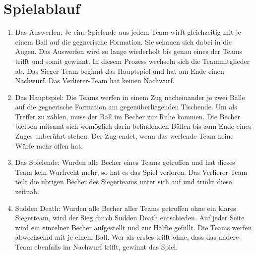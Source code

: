 \section{Spielablauf}\label{Bier-Pong:Spielablauf}
\begin{enumerate}[label={(\arabic*)}]
    \item
    Das Auswerfen: Je eine Spielende aus jedem Team wirft gleichzeitig mit je einem Ball auf die gegnerische Formation.
    Sie schauen sich dabei in die Augen. Das Auswerfen wird so lange wiederholt bis genau eines der Teams trifft und somit gewinnt.
    In diesem Prozess wechseln sich die Teammitglieder ab.
    Das Sieger-Team beginnt das Hauptspiel und hat am Ende einen Nachwurf.
    Das Verlierer-Team hat keinen Nachwurf.

    \item
    Das Hauptspiel: Die Teams werfen in einem Zug nacheinander je zwei Bälle auf die gegnerische Formation am gegenüberliegenden Tischende.
    Um als Treffer zu zählen, muss der Ball im Becher zur Ruhe kommen.
    Die Becher bleiben mitsamt sich womöglich darin befindenden Bällen bis zum Ende eines Zuges unberührt stehen.
    Der Zug endet, wenn das werfende Team keine Würfe mehr offen hat.

    \item
    Das Spielende: Wurden alle Becher eines Teams getroffen und hat dieses Team kein Wurfrecht mehr, so hat es das Spiel verloren.
    Das Verlierer-Team teilt die übrigen Becher des Siegerteams unter sich auf und trinkt diese zeitnah.

    \item
    \glqq{} Sudden Death\grqq{}: Wurden alle Becher aller Teams getroffen ohne ein klares Siegerteam, wird der Sieg durch Sudden Death entschieden.
    Auf jeder Seite wird ein einzelner Becher aufgestellt und zur Hälfte gefüllt.
    Die Teams werfen abwechselnd mit je einem Ball.
    Wer als erstes trifft ohne, dass das andere Team ebenfalls im Nachwurf trifft, gewinnt das Spiel.
\end{enumerate}
    
